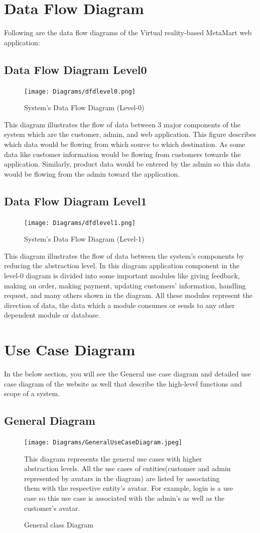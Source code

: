 \section{Data Flow Diagram}
Following are the data flow diagrams of the Virtual reality-based MetaMart web application:
\subsection{Data Flow Diagram Level0}
\begin{figure}[H]
    \centering
    \texttt{[image: Diagrams/dfdlevel0.png]}
    \caption{System’s Data Flow Diagram (Level-0)}
    \label{fig: System’s Data Flow Diagram (Level-0)}
\end{figure}
 \justifying
    This diagram illustrates the flow of data between 3 major components of the system which are the customer, admin, and web application. This figure describes which data would be flowing from which source to which destination. As some data like customer information would be flowing from customers towards the application. Similarly, product data would be entered by the admin so this data would be flowing from the admin toward the application. 
\subsection{Data Flow Diagram Level1}
\begin{figure}[H]
    \centering
    \texttt{[image: Diagrams/dfdlevel1.png]}
    \caption{System’s Data Flow Diagram (Level-1)}
    \label{fig: System’s Data Flow Diagram (Level-1)}
\end{figure}
 \justifying
    This diagram illustrates the flow of data between the system’s components by reducing the abstraction level. In this diagram application component in the level-0 diagram is divided into some important modules like giving feedback, making an order, making payment, updating customers’ information, handling request, and many others shown in the diagram. All these modules represent the direction of data, the data which a module consumes or sends to any other dependent module or database.
\section{Use Case Diagram}
In the below section, you will see the General use case diagram and detailed use case diagram of the website as well that describe the high-level functions and scope of a system. 
\subsection{General Diagram}
\begin{figure}[H]
    \centering
    \texttt{[image: Diagrams/GeneralUseCaseDiagram.jpeg]}
    \caption{General class Diagram}
    \label{fig: General Use case diagram}
   \justifying
   This diagram represents the general use cases with higher abstraction levels. All the use cases of entities(customer and admin represented by avatars in the diagram) are listed by associating them with the respective entity’s avatar. For example, login is a use case so this use case is associated with the admin’s as well as the customer’s avatar.
\end{figure}
